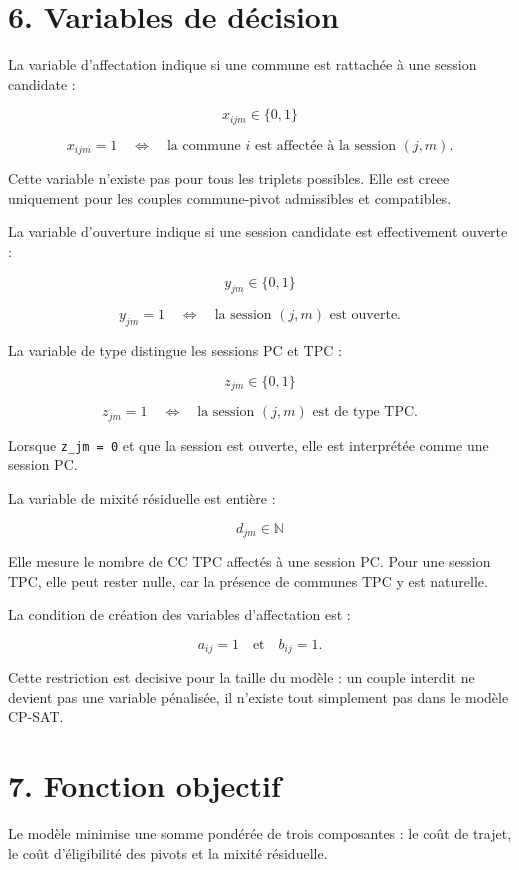 \documentclass[11pt,a4paper]{article}
\begin{document}
\section{6. Variables de décision}

La variable d'affectation indique si une commune est rattachée à une session candidate :

\[
x_{ijm} \in \{0,1\}
\]

\[
x_{ijm}=1
\quad \Longleftrightarrow \quad
\text{la commune } i \text{ est affectée à la session } (j,m).
\]

Cette variable n'existe pas pour tous les triplets possibles. Elle est creee uniquement pour les couples commune-pivot admissibles et compatibles.

La variable d'ouverture indique si une session candidate est effectivement ouverte :

\[
y_{jm} \in \{0,1\}
\]

\[
y_{jm}=1
\quad \Longleftrightarrow \quad
\text{la session } (j,m) \text{ est ouverte.}
\]

La variable de type distingue les sessions PC et TPC :

\[
z_{jm} \in \{0,1\}
\]

\[
z_{jm}=1
\quad \Longleftrightarrow \quad
\text{la session } (j,m) \text{ est de type TPC.}
\]

Lorsque \texttt{z\_jm = 0} et que la session est ouverte, elle est interprétée comme une session PC.

La variable de mixité résiduelle est entière :

\[
d_{jm} \in \mathbb{N}
\]

Elle mesure le nombre de CC TPC affectés à une session PC. Pour une session TPC, elle peut rester nulle, car la présence de communes TPC y est naturelle.

La condition de création des variables d'affectation est :

\[
a_{ij}=1
\quad \text{et} \quad
b_{ij}=1.
\]

Cette restriction est decisive pour la taille du modèle : un couple interdit ne devient pas une variable pénalisée, il n'existe tout simplement pas dans le modèle CP-SAT.

\section{7. Fonction objectif}

Le modèle minimise une somme pondérée de trois composantes : le coût de trajet, le coût d'éligibilité des pivots et la mixité résiduelle.
\end{document}
